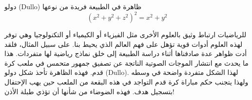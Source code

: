\begin{surferPage}{دولو (Dullo)}
ظاهرة في الطبيعة فريدة من نوعها\\
\smallskip
\[(x^2+ y^2+ z^2)^2	= x^2+ y^2\]

\singlespacing
للرياضيات ارتباط وثيق بالعلوم الأخرى مثل الفيزياء أو الكيمياء أو التكنولوجيا وهي توفر لهذه العلوم أدوات قوية تؤهل على فهم العالم الذي يحيط بنا.
\singlespacing
على سبيل المثال، فلقد أدت ظواهر عدة صادفناها أثناء دراسة الطبيعة إلى خلق نماذج رياضية لها متفردات.
\singlespacing
هذا ما يحدث مع انتشار الموجات الصوتية الناتجة عن تصفيق جمهور متحمس في ملعب كرة قدم. فهذه الظاهرة تأحذ شكل دولو (Dullo). لهذا الشكل متفردة واضحة في وسطه ولهذا يتجنب حكم مباراة كرة قدم التواجد في هذه البقعة من الملعب حين يهب الإحتفال بتسجيل هدف. فهذه الضوضاء من شأنها أن تؤذي طبلة الأذن!
\end{surferPage}
 
